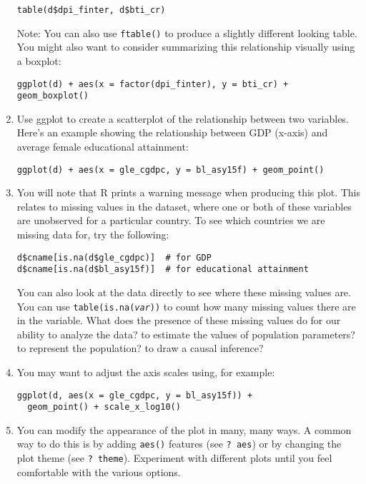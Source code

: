 \documentclass[a4paper,12pt]{article}
\begin{document}
\begin{enumerate}
\begin{verbatim}
table(d$dpi_finter, d$bti_cr)
\end{verbatim}

\noindent Note: You can also use \texttt{ftable()} to produce a slightly different looking table. You might also want to consider summarizing this relationship visually using a boxplot:

\begin{verbatim}
ggplot(d) + aes(x = factor(dpi_finter), y = bti_cr) + geom_boxplot()
\end{verbatim}

\item Use ggplot to create a scatterplot of the relationship between two variables. Here's an example showing the relationship between GDP (x-axis) and average female educational attainment:

\begin{verbatim}
ggplot(d) + aes(x = gle_cgdpc, y = bl_asy15f) + geom_point()
\end{verbatim}

\item You will note that R prints a warning message when producing this plot. This relates to missing values in the dataset, where one or both of these variables are unobserved for a particular country. To see which countries we are missing data for, try the following:

\begin{verbatim}
d$cname[is.na(d$gle_cgdpc)]  # for GDP
d$cname[is.na(d$bl_asy15f)]  # for educational attainment
\end{verbatim}

\noindent You can also look at the data directly to see where these missing values are. You can use \texttt{table(is.na(\textit{var}))} to count how many missing values there are in the variable. What does the presence of these missing values do for our ability to analyze the data? to estimate the values of population parameters? to represent the population? to draw a causal inference?

\item You may want to adjust the axis scales using, for example:

\begin{verbatim}
ggplot(d, aes(x = gle_cgdpc, y = bl_asy15f)) + 
  geom_point() + scale_x_log10()
\end{verbatim}

\item You can modify the appearance of the plot in many, many ways. A common way to do this is by adding \texttt{aes()} features (see \texttt{? aes}) or by changing the plot theme (see \texttt{? theme}). Experiment with different plots until you feel comfortable with the various options.


\end{enumerate}
\end{document}
